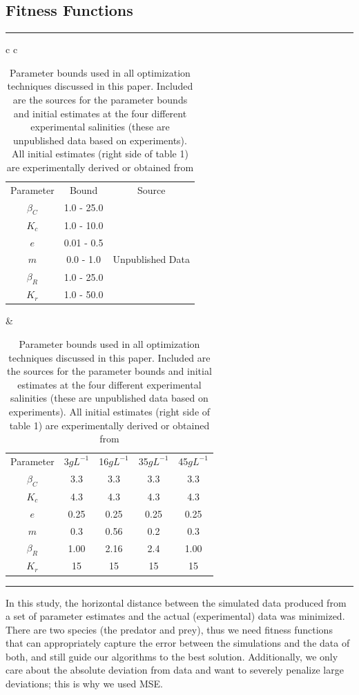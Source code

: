 \documentclass[twocolumn, 9pt]{article}
\begin{document}
\subsection{Fitness Functions}
\begin{table}[t]
    \caption{Parameter bounds used in all optimization techniques discussed in this paper. Included are the sources for the parameter bounds and initial estimates at the four different experimental salinities (these are unpublished data based on experiments). All initial estimates (right side of table 1) are experimentally derived or obtained from \cite{fussmann_crossing_2000}} 
    \hrule
    \begin{tabular}{c c}
        \hline
    	\label{table:Bounds} %
        	\begin{tabular}{c c c}
        	Parameter & Bound & Source \\
        	\cline{1-3}
        	$\beta_C$ & 1.0 - 25.0 & \cite{fussmann_crossing_2000, wen_biological_2005}\\
            $K_c$ & 1.0 - 10.0 & \cite{laliberte_regulation_1989, ahmad_nitrogen_1984}\\
            $e$ & 0.01 - 0.5 & \cite{malekzadeh_viayeh_population_2010, snell_effect_1986}\\
            $m$ & 0.0 - 1.0 & Unpublished Data\\
            $\beta_R$ & 1.0 - 25.0 & \cite{doohan_energy_1973, peredo-alvarez_combined_nodate}\\
            $K_r$ & 1.0 - 50.0 & \cite{cheng_effects_2011, lowe_evidence_2005, yufera_factors_nodate}\\
    	\end{tabular}
    	&
    	\label{table:Bounds} %
        	\begin{tabular}{c c c c c}
        	Parameter & 3$gL^{-1}$ & 16$gL^{-1}$ & 35$gL^{-1}$& 45$gL^{-1}$\\
        	\cline{1-5}
        	$\beta_C$ & 3.3 & 3.3 & 3.3 & 3.3\\
            $K_c$ & 4.3 & 4.3 & 4.3 & 4.3\\
            $e$ & 0.25 & 0.25 & 0.25 & 0.25\\
            $m$ & 0.3 & 0.56 & 0.2 & 0.3\\
            $\beta_R$ & 1.00 & 2.16 & 2.4 & 1.00\\
            $K_r$ & 15 & 15 & 15 & 15\\
    	\end{tabular}
    \end{tabular}
    \hrule
\end{table}
\indent{} In this study, the horizontal distance between the simulated data produced from a set of parameter estimates and the actual (experimental) data was minimized. There are two species (the predator and prey), thus we need fitness functions that can appropriately capture the error between the simulations and the data of both, and still guide our algorithms to the best solution. Additionally, we only care about the absolute deviation from data and want to severely penalize large deviations; this is why we used MSE.
\end{document}
